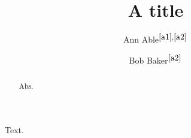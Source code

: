 \documentclass{revtex4-2}
\begin{document}
\title{A title}
\author{Ann Able$^{\ref{a1},\ref{a2}}$}
\author{Bob Baker$^{\ref{a2}}$}
\begin{abstract}Abs.\end{abstract}
\maketitle
Text.
\end{document}
